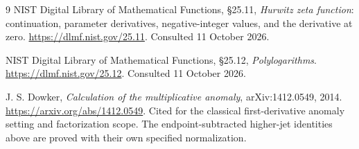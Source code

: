 \documentclass[11pt]{article}
\numberwithin{equation}{section}
\theoremstyle{definition}\newtheorem{definition}[theorem]{Definition}
\theoremstyle{remark}\newtheorem{remark}[theorem]{Remark}
\begin{document}
\begin{thebibliography}{9}
NIST Digital Library of Mathematical Functions, \S25.11,
\emph{Hurwitz zeta function}: continuation, parameter derivatives,
negative-integer values, and the derivative at zero.
\url{https://dlmf.nist.gov/25.11}. Consulted 11 October 2026.

NIST Digital Library of Mathematical Functions, \S25.12,
\emph{Polylogarithms}.
\url{https://dlmf.nist.gov/25.12}. Consulted 11 October 2026.

J. S. Dowker, \emph{Calculation of the multiplicative anomaly},
arXiv:1412.0549, 2014. \url{https://arxiv.org/abs/1412.0549}.
Cited for the classical first-derivative anomaly setting and factorization
scope. The endpoint-subtracted higher-jet identities above are proved
with their own specified normalization.
\end{thebibliography}
\end{document}
